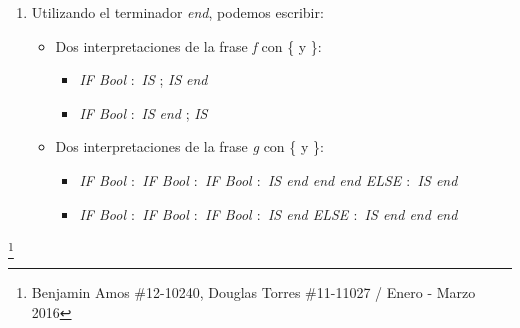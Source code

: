 \documentclass[a4paper, 10pt]{article}
\newcommand\blfootnote[1]{%
  \begingroup
  \renewcommand\thefootnote{}\footnote{#1}%
  \addtocounter{footnote}{-1}%
  \endgroup
}
\begin{document}
\begin{enumerate}
\begin{enumerate}
	\item Utilizando el terminador \textit{end}, podemos escribir:
	\begin{itemize}
		\item Dos interpretaciones de la frase \textit{f} con \{ y \}:
		\begin{itemize}
		\item \textit{IF Bool} $:$ \textit{IS} ; \textit{IS} \textit{end}
		\item \textit{IF Bool} $:$ \textit{IS} \textit{end} ; \textit{IS}
		\end{itemize}

		\item Dos interpretaciones de la frase \textit{g} con \{ y \}:
		\begin{itemize}
		\item \textit{IF Bool $:$ IF Bool $:$ IF Bool $:$ IS \textit{end} \textit{end} \textit{end} ELSE $:$ IS \textit{end}}
		\item \textit{IF Bool $:$ IF Bool $:$ IF Bool $:$ IS \textit{end} ELSE $:$ IS \textit{end} \textit{end} \textit{end}}
		\end{itemize}
		
	\end{itemize}
	
	\end{enumerate}
	\end{enumerate}
	\blfootnote{Benjamin Amos \#12-10240, Douglas Torres \#11-11027 / Enero - Marzo 2016}				 		
	
			
\end{document}
